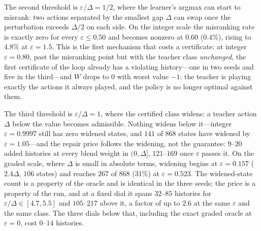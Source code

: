 \documentclass[conference]{IEEEtran}
\begin{document}
The second threshold is $\varepsilon/\Delta=1/2$, where the learner's argmax can start to misrank: two actions separated by the smallest gap $\Delta$ can swap once the perturbation exceeds $\Delta/2$ on each side. On the integer scale the misranking rate is exactly zero for every $\varepsilon\le0.50$ and becomes nonzero at $0.60$ ($0.4\%$), rising to $4.8\%$ at $\varepsilon=1.5$. This is the first mechanism that costs a certificate: at integer $\varepsilon=0.80$, past the misranking point but with the teacher class \emph{unchanged}, the first certificate of the loop already has a violating history---one in two seeds and five in the third---and $W$ drops to $0$ with worst value $-1$: the teacher is playing exactly the actions it always played, and the policy is no longer optimal against them.

The third threshold is $\varepsilon/\Delta=1$, where the certified class widens: a teacher action $\Delta$ below the value becomes admissible. Nothing widens below it---integer $\varepsilon=0.9997$ still has zero widened states, and $141$ of $868$ states have widened by $\varepsilon=1.05$---and the repair price follows the widening, not the guarantee: $9$--$20$ added histories at every blend weight in $(0,\Delta]$, $121$--$169$ once $\varepsilon$ passes it. On the graded scale, where $\Delta$ is small in absolute terms, widening begins at $\varepsilon=0.157$ ($2.4\Delta$, $106$ states) and reaches $267$ of $868$ ($31\%$) at $\varepsilon=0.523$. The widened-state count is a property of the oracle and is identical in the three seeds; the price is a property of the run, and at a fixed dial it spans $32$--$85$ histories for $\varepsilon/\Delta\in[4.7,5.5]$ and $105$--$217$ above it, a factor of up to $2.6$ at the same $\varepsilon$ and the same class. The three dials below that, including the exact graded oracle at $\varepsilon=0$, cost $0$--$14$ histories.
\end{document}
